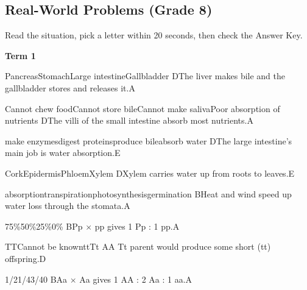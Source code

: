 \subsection{Real-World Problems (Grade 8)}
{\small Read the situation, pick a letter within 20 seconds, then check the Answer Key.\par}
\begin{gradebody}

\textbf{Term 1}

{Pancreas}{Stomach}{Large intestine}{Gallbladder}
{D}{The liver makes bile and the gallbladder stores and releases it.}{A}

{Cannot chew food}{Cannot store bile}{Cannot make saliva}{Poor absorption of nutrients}
{D}{The villi of the small intestine absorb most nutrients.}{A}

{make enzymes}{digest proteins}{produce bile}{absorb water}
{D}{The large intestine's main job is water absorption.}{E}

{Cork}{Epidermis}{Phloem}{Xylem}
{D}{Xylem carries water up from roots to leaves.}{E}

{absorption}{transpiration}{photosynthesis}{germination}
{B}{Heat and wind speed up water loss through the stomata.}{A}

{75\%}{50\%}{25\%}{0\%}
{B}{Pp $\times$ pp gives 1 Pp : 1 pp.}{A}

{TT}{Cannot be known}{tt}{Tt}
{A}{A Tt parent would produce some short (tt) offspring.}{D}

{1/2}{1/4}{3/4}{0}
{B}{Aa $\times$ Aa gives 1 AA : 2 Aa : 1 aa.}{A}


\end{gradebody}
